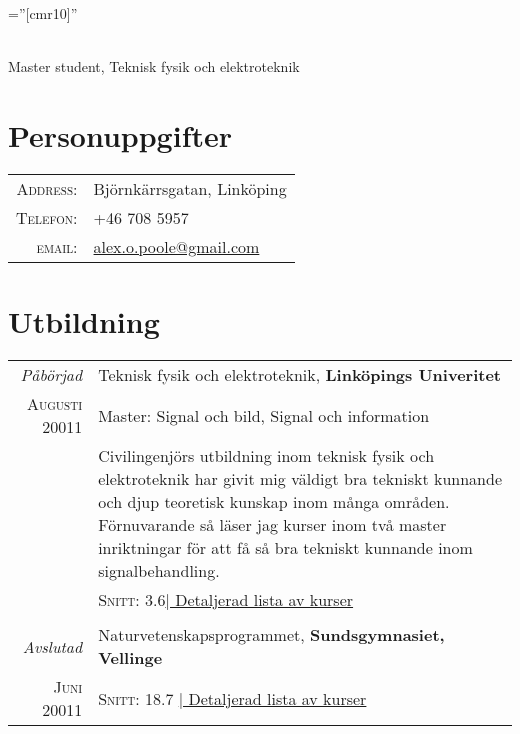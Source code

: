 \documentclass[a4paper,10pt]{article}
\begin{document}

\pagestyle{empty} %

\font\fb=''[cmr10]'' %

\par{ \\ Master student, Teknisk fysik och elektroteknik
    \bigskip\par}

\section{Personuppgifter}

\begin{tabular}{rl}
    \textsc{Address:}   & Björnkärrsgatan, Linköping \\
    \textsc{Telefon:}     & +46 708 5957\\
    \textsc{email:}     & \href{mailto:alex.o.poole@gmail.com}{alex.o.poole@gmail.com}
\end{tabular}

\section{Utbildning}
\begin{tabular}{r|p{11cm}}	


 \emph{Påbörjad} & Teknisk fysik och elektroteknik, \textbf{Linköpings Univeritet}\\
\textsc{Augusti} 20011 &  Master: Signal och bild, Signal och information\\
& \footnotesize{Civilingenjörs utbildning inom teknisk fysik och elektroteknik har givit mig väldigt bra tekniskt kunnande och djup teoretisk kunskap inom många områden. Förnuvarande så läser jag kurser inom två master inriktningar för att få så bra tekniskt kunnande inom signalbehandling.}\\
&\normalsize \textsc{Snitt}: 3.6\hyperlink{grds_cleli}{\hfill| \footnotesize Detaljerad lista av kurser}
\\\multicolumn{2}{c}{} \\

\emph{Avslutad} & Naturvetenskapsprogrammet, \textbf{Sundsgymnasiet, Vellinge}\\
\textsc{Juni} 20011 & \normalsize \textsc{Snitt}: 18.7 \hyperlink{grds_cleli}{\hfill| \footnotesize Detaljerad lista av kurser}
\\

\end{tabular}
\end{document}
